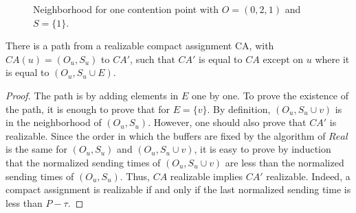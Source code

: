 \begin{figure}
\begin{center}


 \caption{Neighborhood for one contention point with $O = (0,2,1)$ and $S = \{1\}$.}

\label{fig:partialtreeneigh}
\end{center}
\end{figure}

\begin{lemma}\label{lemma:path}
There is a path from a realizable compact assignment CA, with $CA(u) = (O_u,S_u)$ to $CA'$, such that 
$CA'$ is equal to $CA$ except on $u$ where it is equal to $(O_u,S_u \cup E)$.  
\end{lemma}
\begin{proof}
The path is by adding elements in $E$ one by one. 
 To prove the existence of the path, it is enough to prove that for  $E = \{v\}$. By definition, $(O_u,S_u \cup{v})$ is in the neighborhood of $(O_u,S_u)$. However, one should also prove that $CA'$ is realizable.
  Since the order in which the buffers are fixed by the algorithm of $Real$ is the same for $(O_u,S_u)$ and $(O_u,S_u \cup{v})$, it is easy to prove by induction that the normalized sending times of $(O_u,S_u \cup{v})$ are less than the normalized sending times of $(O_u,S_u)$. Thus, $CA$ realizable implies $CA'$ realizable. Indeed, 
a compact assignment is realizable if and only if the last normalized sending time is less than $P - \tau$.
\end{proof}



